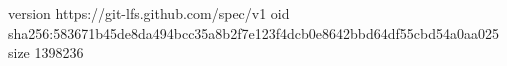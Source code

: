 version https://git-lfs.github.com/spec/v1
oid sha256:583671b45de8da494bcc35a8b2f7e123f4dcb0e8642bbd64df55cbd54a0aa025
size 1398236
